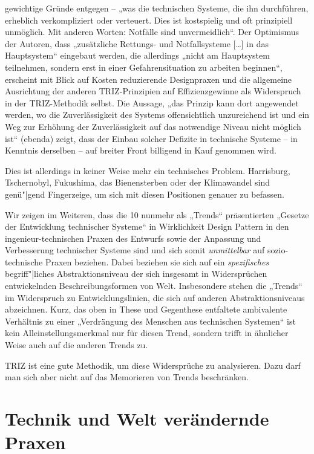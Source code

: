 \documentclass[11pt,a4paper]{article}
\begin{document}
gewichtige Gründe entgegen -- „was die technischen Systeme, die ihn
durchführen, erheblich verkompliziert oder verteuert. Dies ist kostspielig und
oft prinzipiell unmöglich. Mit anderen Worten: Notfälle sind unvermeidlich“.
Der Optimismus der Autoren, dass „zusätzliche Rettungs- und Notfallsysteme
[\ldots] in das Hauptsystem“ eingebaut werden, die allerdings „nicht am
Hauptsystem teilnehmen, sondern erst in einer Gefahrensituation zu arbeiten
beginnen“, erscheint mit Blick auf Kosten reduzierende Designpraxen und die
allgemeine Ausrichtung der anderen TRIZ-Prinzipien auf Effizienzgewinne als
Widerspruch in der TRIZ-Methodik selbst. Die Aussage, „das Prinzip kann dort
angewendet werden, wo die Zuverlässigkeit des Systems offensichtlich
unzureichend ist und ein Weg zur Erhöhung der Zuverlässigkeit auf das
notwendige Niveau nicht möglich ist“ (ebenda) zeigt, dass der Einbau solcher
Defizite in technische Systeme -- in Kenntnis derselben -- auf breiter Front
billigend in Kauf genommen wird.

Dies ist allerdings in keiner Weise mehr ein technisches Problem.  Harrisburg,
Tschernobyl, Fukushima, das Bienensterben \cite{Jacobasch2019} oder der
Klimawandel sind genü"|gend Fingerzeige, um sich mit diesen Positionen genauer
zu befassen.

Wir zeigen im Weiteren, dass die 10 nunmehr als „Trends“ präsentierten
„Gesetze der Entwicklung technischer Systeme“ in Wirklichkeit Design Pattern
in den ingenieur-technischen Praxen des Entwurfs sowie der Anpassung und
Verbesserung technischer Systeme sind und sich somit \emph{unmittelbar} auf
sozio-technische Praxen beziehen. Dabei beziehen sie sich auf ein
\emph{spezifisches} begriff"|liches Abstraktionsniveau der sich insgesamt in
Widersprüchen entwickelnden Beschreibungsformen von Welt. Insbesondere stehen
die „Trends“ im Widerspruch zu Entwicklungslinien, die sich auf anderen
Abstraktionsniveaus abzeichnen. Kurz, das oben in These und Gegenthese
entfaltete ambivalente Verhältnis zu einer „Verdrängung des Menschen aus
technischen Systemen“ ist kein Alleinstellungsmerkmal nur für diesen Trend,
sondern trifft in ähnlicher Weise auch auf die anderen Trends zu.

TRIZ ist eine gute Methodik, um diese Widersprüche zu analysieren. Dazu darf
man sich aber nicht auf das Memorieren von Trends beschränken.  

\section{Technik und Welt verändernde Praxen}
\end{document}
